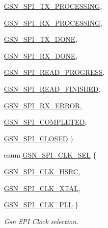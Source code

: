 \begin{DoxyCompactItemize}
\par
\hyperlink{a00587_acadb33517f6f254dce30d69f644a88c6af100c5f000f497c982ab367b280f2b96}{GSN\_\-SPI\_\-TX\_\-PROCESSING}, 
\par
\hyperlink{a00587_acadb33517f6f254dce30d69f644a88c6ad5d5b165a37bc78ee0dc5fafeaabafd7}{GSN\_\-SPI\_\-RX\_\-PROCESSING}, 
\par
\hyperlink{a00587_acadb33517f6f254dce30d69f644a88c6a42232c7523efa71c39f9253c26380560}{GSN\_\-SPI\_\-TX\_\-DONE}, 
\par
\hyperlink{a00587_acadb33517f6f254dce30d69f644a88c6a06b886e5cb4de1abfa2cf8e14e496c77}{GSN\_\-SPI\_\-RX\_\-DONE}, 
\par
\hyperlink{a00587_acadb33517f6f254dce30d69f644a88c6a1fe8bd56614e4776ae59f33b5bf10bdc}{GSN\_\-SPI\_\-READ\_\-PROGRESS}, 
\par
\hyperlink{a00587_acadb33517f6f254dce30d69f644a88c6a844ce873b70e1441f77360fbe8824f0c}{GSN\_\-SPI\_\-READ\_\-FINISHED}, 
\par
\hyperlink{a00587_acadb33517f6f254dce30d69f644a88c6aa51f0942d34d13422840d54613e93bfe}{GSN\_\-SPI\_\-RX\_\-ERROR}, 
\par
\hyperlink{a00587_acadb33517f6f254dce30d69f644a88c6a159c78cc937dc640681c25167195c72c}{GSN\_\-SPI\_\-COMPLETED}, 
\par
\hyperlink{a00587_acadb33517f6f254dce30d69f644a88c6ab0ed55469a52e6fe7079f4b3fa227bdc}{GSN\_\-SPI\_\-CLOSED}
 \}
\item 
enum \hyperlink{a00655_ga26d561511c040815639b118310656f40}{GSN\_\-SPI\_\-CLK\_\-SEL} \{ \par
\hyperlink{a00655_gga26d561511c040815639b118310656f40af41fa8bd6972b83d132eed405b5fdfd5}{GSN\_\-SPI\_\-CLK\_\-HSRC}, 
\par
\hyperlink{a00655_gga26d561511c040815639b118310656f40ae499c0694c1b79936ff89f81486431f1}{GSN\_\-SPI\_\-CLK\_\-XTAL}, 
\par
\hyperlink{a00655_gga26d561511c040815639b118310656f40a55316df6045aeefd9e9491d23c481d21}{GSN\_\-SPI\_\-CLK\_\-PLL}
 \}
\begin{DoxyCompactList}\small\item\em Gsn SPI Clock selection. \end{DoxyCompactList}\end{DoxyCompactItemize}
